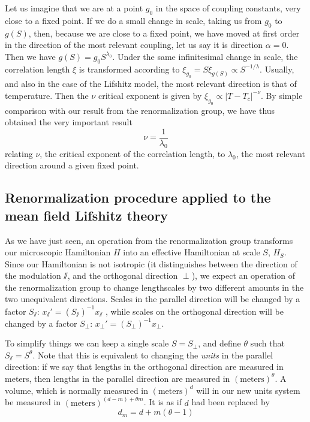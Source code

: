 Let us imagine that we are at a point $g_0$ in the space of coupling constants, very close to a fixed point. If we do a small change in scale, taking us from $g_0$ to $g(S)$, then, because we are close to a fixed point, we have moved at first order in the direction of the most relevant coupling, let us say it is direction $\alpha = 0$. Then we have $ g(S) = g_0 S^{\lambda_0}$.
Under the same infinitesimal change in scale, the correlation length $\xi$ is transformed according to $\xi_{g_0} = S \xi_{g(S)} \propto S^{-1/\lambda}$. Usually, and also in the case of the Lifshitz model, the most relevant direction is that of temperature. Then the $\nu$ critical exponent is given by $\xi_{g_0} \propto |T - T_c|^{-\nu}$. 
By simple comparison with our result from the renormalization group, we have thus obtained the very important result
\begin{equation}
\nu = \frac{1}{\lambda_0}
\end{equation}
relating $\nu$, the critical exponent of the correlation length, to $\lambda_0$, the most relevant direction around a given fixed point.

\subsection{Renormalization procedure applied to the mean field Lifshitz theory}

As we have just seen, an operation from the renormalization group transforms our microscopic Hamiltonian $H$ into an effective Hamiltonian at scale $S$, $H_{S}$.%
Since our Hamiltonian is not isotropic (it distinguishes between the direction of the modulation $\sslash$, and the orthogonal direction $\perp$), we expect an operation of the renormalization group to change lengthscales by two different amounts in the two unequivalent directions. 
Scales in the parallel direction will be changed by a factor $S_\sslash$: $x_\sslash' = (S_\sslash)^{-1} x_\sslash$
, while scales on the orthogonal direction will be changed by a factor $S_\perp$: $x_\perp' = (S_\perp)^{-1} x_\perp$.

To simplify things we can keep a single scale $S = S_\perp$, and define $\theta$ such that $S_\sslash = S^\theta$. Note that this is equivalent to changing the \textit{units} in the parallel direction: if we say that lengths in the orthogonal direction are measured in meters, then lengths in the parallel direction are measured in $(\text{meters})^\theta$.
A volume, which is normally measured in $(\text{meters})^d$ will in our new units system be measured in $(\text{meters})^{(d-m) + \theta m}$. It is as if $d$ had been replaced by
\begin{equation}
d_m = d+ m(\theta -1)
\end{equation}

